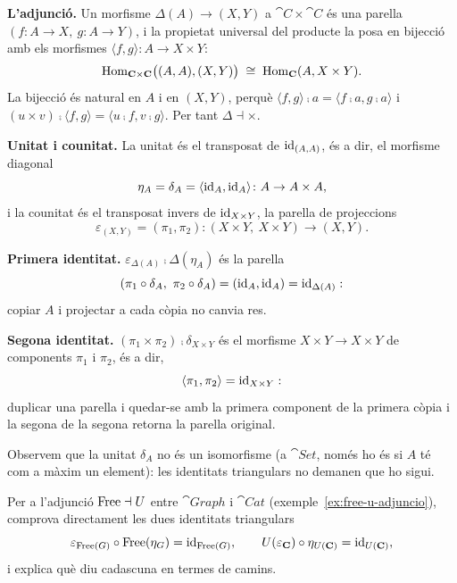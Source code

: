\begin{solucio}
\textbf{L'adjunció.} Un morfisme $\Delta(A)\to(X,Y)$ a $\cat{C}\times\cat{C}$ és una parella $(f\colon A\to X,\ g\colon A\to Y)$, i la propietat universal del producte la posa en bijecció amb els morfismes $\langle f,g\rangle\colon A\to X\times Y$:
\[
\operatorname{Hom}_{\mathbf{C}\times\mathbf{C}}\bigl((A,A),(X,Y)\bigr)\;\cong\;\operatorname{Hom}_{\mathbf{C}}(A,X\times Y).
\]
La bijecció és natural en $A$ i en $(X,Y)$, perquè $\langle f,g\rangle\comp a=\langle f\comp a,g\comp a\rangle$ i $(u\times v)\comp\langle f,g\rangle=\langle u\comp f,v\comp g\rangle$. Per tant $\Delta\dashv\times$.

\textbf{Unitat i counitat.} La unitat és el transposat de $\operatorname{id}_{(A,A)}$, és a dir, el morfisme diagonal
\[
\eta_A=\delta_A=\langle\operatorname{id}_A,\operatorname{id}_A\rangle\colon A\to A\times A,
\]
i la counitat és el transposat invers de $\operatorname{id}_{X\times Y}$, la parella de projeccions
\[
\varepsilon_{(X,Y)}=(\pi_1,\pi_2)\colon(X\times Y,\ X\times Y)\to(X,Y).
\]

\textbf{Primera identitat.} $\varepsilon_{\Delta(A)}\comp\Delta(\eta_A)$ és la parella
\[
(\pi_1\comp\delta_A,\ \pi_2\comp\delta_A)=(\id_A,\id_A)=\id_{\Delta(A)}:
\]
copiar $A$ i projectar a cada còpia no canvia res.

\textbf{Segona identitat.} $(\pi_1\times\pi_2)\comp\delta_{X\times Y}$ és el morfisme $X\times Y\to X\times Y$ de components $\pi_1$ i $\pi_2$, és a dir,
\[
\langle\pi_1,\pi_2\rangle=\operatorname{id}_{X\times Y}:
\]
duplicar una parella i quedar-se amb la primera component de la primera còpia i la segona de la segona retorna la parella original.

Observem que la unitat $\delta_A$ no és un isomorfisme (a $\cat{Set}$, només ho és si $A$ té com a màxim un element): les identitats triangulars no demanen que ho sigui.
\end{solucio}

\begin{exercici}\label{pr-free-u-triangulars}
Per a l'adjunció $\operatorname{Free}\dashv U$ entre $\cat{Graph}$ i $\cat{Cat}$ (exemple~\ref{ex:free-u-adjuncio}), comprova directament les dues identitats triangulars
\[
\varepsilon_{\operatorname{Free}(G)}\circ\operatorname{Free}(\eta_G)=\operatorname{id}_{\operatorname{Free}(G)},
\qquad
U(\varepsilon_{\mathbf{C}})\circ\eta_{U(\mathbf{C})}=\operatorname{id}_{U(\mathbf{C})},
\]
i explica què diu cadascuna en termes de camins.
\end{exercici}

